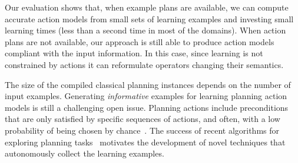 \documentclass[letterpaper]{article} %
\newcommand{\strips}{\textsc{Strips}}     %
\begin{document}
Our evaluation shows that, when example plans are available, we can compute accurate action models from small sets of learning examples and investing small learning times (less than a second time in most of the domains). When action plans are not available, our approach is still able to produce action models compliant with the input information. In this case, since learning is not constrained by actions it can reformulate operators changing their semantics. %


The size of the compiled classical planning instances depends on the number of input examples. Generating {\em informative} examples for learning planning action models is still a challenging open issue. Planning actions include preconditions that are only satisfied by specific sequences of actions, and often, with a low probability of being chosen by chance~\cite{fern2004learning}. The success of recent algorithms for exploring planning tasks~\cite{geffner:novelty:IJCAI17} motivates the development of novel techniques that autonomously collect the learning examples. 


\newpage



\end{document}
